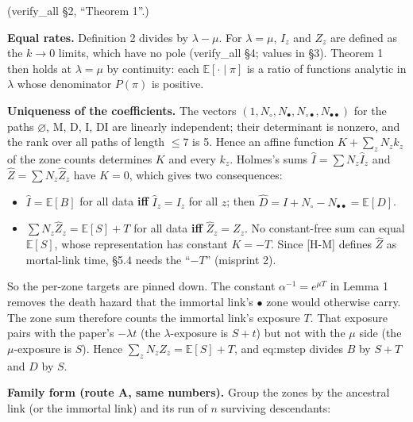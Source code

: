 \documentclass[10pt,]{article}
\providecommand{\tightlist}{%
  \setlength{\itemsep}{0pt}\setlength{\parskip}{0pt}}
\begin{document}
(verify\_all §2, ``Theorem 1''.)

\textbf{Equal rates.} Definition 2 divides by \(\lambda-\mu\). For
\(\lambda=\mu\), \(I_z\) and \(Z_z\) are defined as the \(k\to0\)
limits, which have no pole (verify\_all §4; values in §3). Theorem 1
then holds at \(\lambda=\mu\) by continuity: each
\(\mathbb E[\cdot\mid\pi]\) is a ratio of functions analytic in
\(\lambda\) whose denominator \(P(\pi)\) is positive.

\textbf{Uniqueness of the coefficients.} The vectors
\((1,N_\circ,N_\bullet,N_{\circ\bullet},N_{\bullet\bullet})\) for the
paths \(\varnothing\), M, D, I, DI are linearly independent; their
determinant is nonzero, and the rank over all paths of length \(\le7\)
is 5. Hence an affine function \(K+\sum_zN_zk_z\) of the zone counts
determines \(K\) and every \(k_z\). Holmes's sums
\(\hat I=\sum N_z\hat I_z\) and \(\hat Z=\sum N_z\hat Z_z\) have
\(K=0\), which gives two consequences:

\begin{itemize}
\tightlist
\item
  \(\hat I=\mathbb E[B]\) for all data \textbf{iff} \(\hat I_z=I_z\) for
  all \(z\); then
  \(\hat D=\hat I+N_\circ-N_{\bullet\bullet}=\mathbb E[D]\).
\item
  \(\sum N_z\hat Z_z=\mathbb E[S]+T\) for all data \textbf{iff}
  \(\hat Z_z=Z_z\). No constant-free sum can equal \(\mathbb E[S]\),
  whose representation has constant \(K=-T\). Since {[}H-M{]} defines
  \(\hat Z\) as mortal-link time, §5.4 needs the ``\(-T\)'' (misprint
  2).
\end{itemize}

So the per-zone targets are pinned down. The constant
\(\alpha^{-1}=e^{\mu T}\) in Lemma 1 removes the death hazard that the
immortal link's \(\bullet\) zone would otherwise carry. The zone sum
therefore counts the immortal link's exposure \(T\). That exposure pairs
with the paper's \(-\lambda t\) (the \(\lambda\)-exposure is \(S+t\))
but not with the \(\mu\) side (the \(\mu\)-exposure is \(S\)). Hence
\(\sum_zN_zZ_z=\mathbb E[S]+T\), and eq:mstep divides \(B\) by \(S+T\)
and \(D\) by \(S\).

\textbf{Family form (route A, same numbers).} Group the zones by the
ancestral link (or the immortal link) and its run of \(n\) surviving
descendants:
\end{document}
